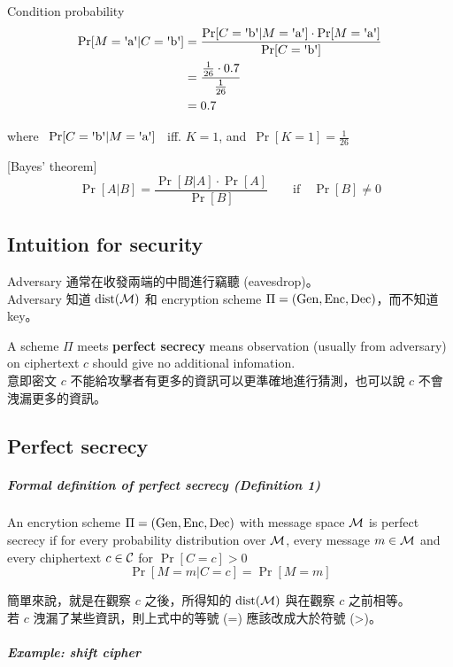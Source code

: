 Condition probability
\begin{align*}
	\Pr[M = \letter{a} | C =  \letter{b}] &=
	\frac{\Pr[C = \letter{b} | M = \letter{a}] \cdot \Pr[M = \letter{a}]}{\Pr[C = \letter{b}]} \\
	&= \frac{\frac{1}{26} \cdot 0.7}{\frac{1}{26}} \\
	&= 0.7
\end{align*}

where \, \(\Pr[C = \letter{b} | M = \letter{a}]\) \, iff. \(K = 1\), and\, \(\Pr[K = 1] = \displaystyle\frac{1}{26}\)

[Bayes' theorem]
\[\Pr[A|B] = \frac{\Pr[B|A] \cdot \Pr[A]}{\Pr[B]} \qquad \text{if} \quad \Pr[B] \neq 0\]


\subsection{Intuition for security}

Adversary 通常在收發兩端的中間進行竊聽 (eavesdrop)。 \\
Adversary 知道 \(\operatorname{dist}(\operatorname{\mathcal{M}})\) 和 encryption scheme \(\Pi = (\operatorname{Gen}, \operatorname{Enc}, \operatorname{Dec})\)，而不知道 key。

A scheme \(\Pi\) meets \textbf{perfect secrecy} means observation (usually from adversary) on ciphertext \(c\) should give no additional infomation. \\
意即密文 \(c\) 不能給攻擊者有更多的資訊可以更準確地進行猜測，也可以說 \(c\) 不會洩漏更多的資訊。


\subsection{Perfect secrecy}

\subparagraph{Formal definition of perfect secrecy (\textbf{Definition 1})}

An encrytion scheme \(\Pi = (\operatorname{Gen}, \operatorname{Enc}, \operatorname{Dec})\) with message space \(\operatorname{\mathcal{M}}\) is perfect secrecy if for every probability distribution over \(\operatorname{\mathcal{M}}\), every message \(m \in \operatorname{\mathcal{M}}\) and every chiphertext \(c \in \operatorname{\mathcal{C}}\) for \(\Pr[C = c] > 0\)
\[\Pr[M = m | C = c] = \Pr[M = m]\]

簡單來說，就是在觀察 \(c\) 之後，所得知的 \(\operatorname{dist}(\operatorname{\mathcal{M}})\) 與在觀察 \(c\) 之前相等。 \\
若 \(c\) 洩漏了某些資訊，則上式中的等號 (=) 應該改成大於符號 (>)。


\subparagraph{Example: shift cipher}

